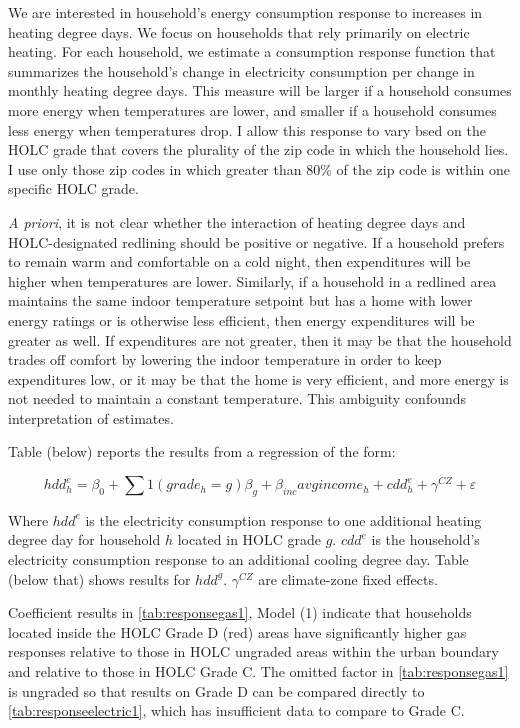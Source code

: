 \documentclass[
]{article}
\begin{document}
We are interested in household's energy consumption response to increases in heating degree days. We focus on households that rely primarily on electric heating. For each household, we
estimate a consumption response function that summarizes the household's change in electricity consumption per change in monthly heating degree days.
This measure will be larger if a household consumes more energy when temperatures are lower, and smaller if a household consumes less energy when temperatures drop.
I allow this response to vary bsed on the HOLC grade that covers the plurality of the zip code in which the household lies. I use only those zip codes in which greater than 80\%
of the zip code is within one specific HOLC grade.

\emph{A priori}, it is not clear whether the interaction of heating degree days and HOLC-designated redlining should be positive or negative. If a household
prefers to remain warm and comfortable on a cold night, then expenditures will be higher when temperatures are lower. Similarly, if a household in a redlined area
maintains the same indoor temperature setpoint but has a home with lower energy ratings or is otherwise less efficient, then energy expenditures will be greater as well.
If expenditures are not greater, then it may be that the household trades off comfort by lowering the indoor temperature in order to keep expenditures low, or
it may be that the home is very efficient, and more energy is not needed to maintain a constant temperature. This ambiguity confounds interpretation of estimates.

Table (below) reports the results from a regression of the form:

\[hdd^e_h = \beta_0 + \sum 1(grade_h=g)\beta_g + \beta_{inc} avgincome_h + cdd^e_h + \gamma^{CZ} + \varepsilon\]

Where \(hdd^e\) is the electricity consumption response to one additional heating degree day for household \(h\) located in HOLC grade \(g\). \(cdd^e\) is the household's electricity consumption response
to an additional cooling degree day. Table (below that) shows results for \(hdd^g\). \(\gamma^{CZ}\) are climate-zone fixed effects.

Coefficient results in \ref{tab:responsegas1}, Model (1) indicate that households located inside the HOLC Grade D (red) areas
have significantly higher gas responses relative to those in HOLC ungraded areas within the urban boundary and relative
to those in HOLC Grade C. The omitted factor in \ref{tab:responsegas1} is ungraded so that results on Grade D can be
compared directly to \ref{tab:responseelectric1}, which has insufficient data to compare to Grade C.
\end{document}
